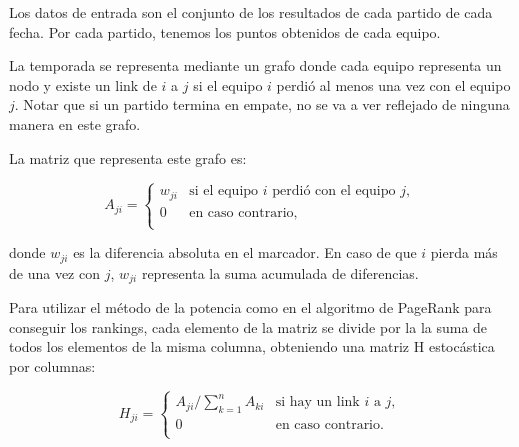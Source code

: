 Los datos de entrada son el conjunto de los resultados de cada partido de cada fecha. Por cada partido, tenemos los puntos obtenidos de cada equipo.

La temporada se representa mediante un grafo donde cada equipo representa un nodo y existe un link de $i$ a $j$ si el equipo $i$ perdi\'o al
menos una vez con el equipo $j$. Notar que si un partido termina en empate, no se va a ver reflejado de ninguna manera en este grafo.

La matriz que representa este grafo es:

\begin{equation*}
A_{ji} = \left\{
  \begin{array}{cl}
  w_{ji} & \text{si el equipo } i \text{ perdi\'o con el equipo } j,\\
  0 & \text{en caso contrario, }\\
  \end{array} \right.
\end{equation*}

\noindent donde $w_{ji}$ es la diferencia absoluta en el marcador. En caso de que $i$ pierda m\'as de una vez con $j$, $w_{ji}$ representa la suma
acumulada de diferencias. 

Para utilizar el método de la potencia como en el algoritmo de PageRank para conseguir los rankings, cada elemento de la matriz se divide por la la suma de todos los elementos de la misma columna, obteniendo una matriz H estocástica por columnas:

\begin{equation*}
H_{ji} = \left\{
  \begin{array}{cl}
  A_{ji}/\sum_{k = 1}^n A_{ki} & \text{si hay un link } i \text{ a } j,\\
  0 & \text{en caso contrario.}\\
  \end{array} \right.
\end{equation*}
